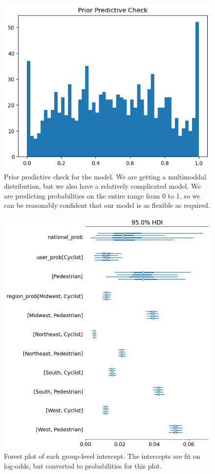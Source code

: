 \documentclass[12pt]{article}
\begin{document}
\begin{figure}[h]
    \centering
    \includegraphics[width=\textwidth]{images/prior_predictive_check.png}
    \caption{Prior predictive check for the model. We are getting a multimoddal distribution, but we
        also have a relatively complicated model. We are predicting probabilities on the entire
        range from 0 to 1, so we can be reasonably confident that our model is as flexible as required.}
    \label{fig:ppc}
\end{figure}

\begin{figure}[h]
    \centering
    \includegraphics[width=\textwidth]{images/prob_intercepts.png}
    \caption{Forest plot of each group-level intercept. The intercepts are fit on log-odds,
        but converted to probabilities for this plot.}
    \label{fig:prob_intercepts}
\end{figure}
\end{document}
